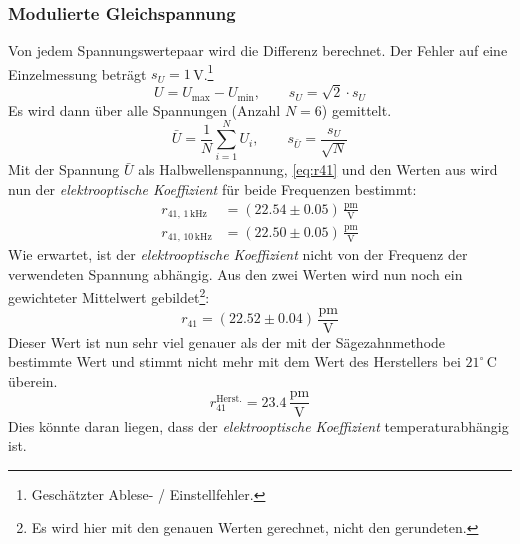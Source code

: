 \subsubsection{Modulierte Gleichspannung}
Von jedem Spannungswertepaar wird die Differenz berechnet. 
Der Fehler auf eine Einzelmessung beträgt $s_U = 1$\,V.\footnote{Geschätzter Ablese- / Einstellfehler.}
\begin{equation}
  U = U_{\text{max}} - U_{\text{min}}, \qquad s_U = \sqrt{2} \cdot s_U
\end{equation}
Es wird dann über alle Spannungen (Anzahl $N = 6$) gemittelt.
\begin{equation}
  \bar{U} = \frac{1}{N} \sum_{i=1}^{N} U_i, \qquad s_{\bar{U}} = \frac{s_U}{\sqrt{N}}
\end{equation}
Mit der Spannung $\bar{U}$ als Halbwellenspannung, \autoref{eq:r41} und den Werten aus \cite{manual} wird nun der \emph{elektrooptische Koeffizient} für beide Frequenzen bestimmt:
\begin{equation}
  \begin{split}
    r_{41,\, 1\,\text{kHz}}  &= (22.54 \pm 0.05) \, \frac{\text{pm}}{\text{V}} \\
    r_{41,\, 10\,\text{kHz}} &= (22.50 \pm 0.05) \, \frac{\text{pm}}{\text{V}} 
  \end{split}
\end{equation}
Wie erwartet, ist der \emph{elektrooptische Koeffizient} nicht von der Frequenz der verwendeten Spannung abhängig. Aus den zwei Werten wird 
nun noch ein gewichteter Mittelwert gebildet\footnote{Es wird hier mit den genauen Werten gerechnet, nicht den gerundeten.}:
\begin{equation}
  r_{41} = (22.52 \pm 0.04) \, \frac{\text{pm}}{\text{V}}
\end{equation}
Dieser Wert ist nun sehr viel genauer als der mit der Sägezahnmethode bestimmte Wert und stimmt nicht mehr mit dem Wert des Herstellers bei $21^\circ$\,C überein.
\begin{equation}
  r_{41}^{\text{Herst.}} = 23.4 \, \frac{\text{pm}}{\text{V}}
\end{equation}
Dies könnte daran liegen, dass der \emph{elektrooptische Koeffizient} temperaturabhängig ist.